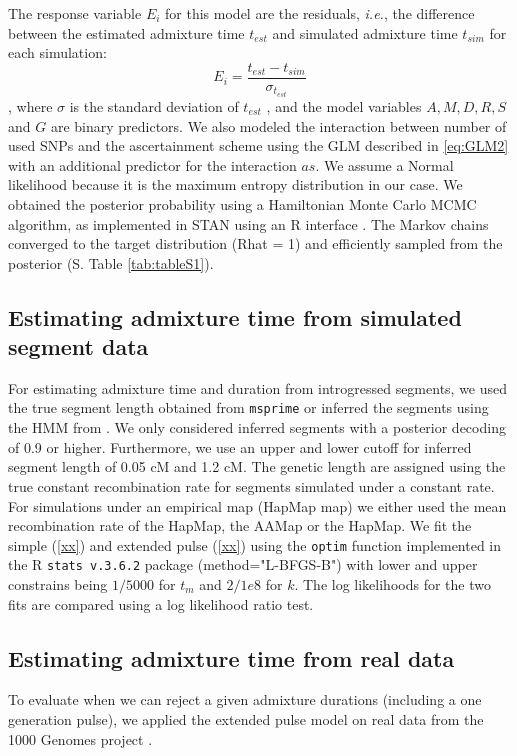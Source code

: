 \documentclass[11pt]{article}
\begin{document}
The response variable $E_i$ for this model are the residuals, \emph{i.e.}, the difference between the estimated admixture time $t_{est}$ and simulated admixture time $t_{sim}$ for each simulation:
$$E_i = \frac{t_{est} - t_{sim}}{\sigma_{t_{est}}}$$, where $\sigma$ is the standard deviation of $t_{est}$ , and the model variables $A, M, D, R, S$ and $G$ are binary predictors. We also modeled the interaction between number of used SNPs and the ascertainment scheme using the GLM described in \ref{eq:GLM2} with an additional predictor for the interaction $as$.
We assume a Normal likelihood because it is the maximum entropy distribution in our case. We obtained the posterior probability using a Hamiltonian Monte Carlo MCMC algorithm, as implemented in STAN \citep{carpenter_stan_2017} using an R interface \citep{stan_development_team_rstan_2018,mcelreath_statistical_2020}. The Markov chains converged to the target distribution (Rhat = 1) and efficiently sampled from the posterior (S. Table \ref{tab:tableS1}).  

\subsection{Estimating admixture time from simulated segment data}\label{Estimating admixture time from simulated segment data}

For estimating admixture time and duration from introgressed segments, we used the true segment length obtained from \texttt{msprime} or inferred the segments using the HMM from \cite{skov_detecting_2018}. We only considered inferred segments with a posterior decoding of 0.9 or higher. Furthermore, we use an upper and lower cutoff for inferred segment length of 0.05 cM and 1.2 cM. The genetic length are assigned using the true constant recombination rate for segments simulated under a constant rate. For simulations under an empirical map (HapMap map) we either used the mean recombination rate of the HapMap, the AAMap or the HapMap.
We fit the simple (\ref{xx}) and extended pulse (\ref{xx}) using the \texttt{optim} function implemented in the R \texttt{stats v.3.6.2} package (method="L-BFGS-B") with lower and upper constrains being $1/5000$ for $t_m$ and $2/1e8$ for $k$. The log likelihoods for the two fits are compared using a log likelihood ratio test.

\subsection{Estimating admixture time from real data}\label{Estimating admixture time from real data}
To evaluate when we can reject a given admixture durations (including a one generation pulse), we applied the extended pulse model on real data from the 1000 Genomes project \citep{the_1000_genomes_project_consortium_global_2015}.
\end{document}
